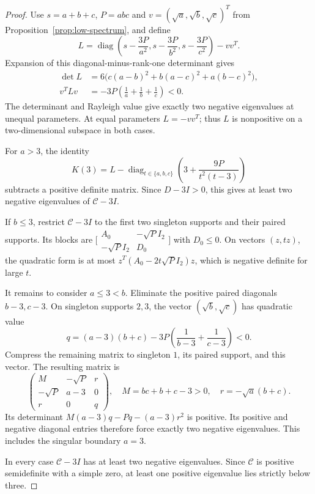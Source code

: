 \begin{proof}
Use $s=a+b+c$, $P=abc$ and $v=(\sqrt a,\sqrt b,\sqrt c)^T$ from
Proposition~\ref{prop:low-spectrum}, and define
\[
L=\operatorname{diag}\left(s-\frac{3P}{a^2},
s-\frac{3P}{b^2},s-\frac{3P}{c^2}\right)-vv^T.
\]
Expansion of this diagonal-minus-rank-one determinant gives
\begin{align*}
\det L&=6\bigl(c(a-b)^2+b(a-c)^2+a(b-c)^2\bigr),\\
v^TLv&=-3P\left(\frac1a+\frac1b+\frac1c\right)<0.
\end{align*}
The determinant and Rayleigh value give exactly two negative eigenvalues
at unequal parameters. At equal parameters $L=-vv^T$; thus $L$ is
nonpositive on a two-dimensional subspace in both cases.

For $a>3$, the identity
\[
K(3)=L-\operatorname{diag}_{t\in\{a,b,c\}}
\left(3+\frac{9P}{t^2(t-3)}\right)
\]
subtracts a positive definite matrix. Since $D-3I>0$, this gives
at least two negative eigenvalues of $\mathcal C-3I$.

If $b\leq3$, restrict $\mathcal C-3I$ to the first two singleton
supports and their paired supports. Its blocks are
$\bigl[\begin{smallmatrix}A_0&-\sqrt P I_2\\-\sqrt P I_2&D_0\end{smallmatrix}\bigr]$
with $D_0\leq0$. On vectors $(z,tz)$, the quadratic form is at most
$z^T(A_0-2t\sqrt P I_2)z$, which is negative definite for large $t$.

It remains to consider $a\leq3<b$. Eliminate the positive paired
diagonals $b-3,c-3$. On singleton supports $2,3$, the vector
$(\sqrt b,\sqrt c)$ has quadratic value
\[
 q=(a-3)(b+c)-3P\left(\frac1{b-3}+\frac1{c-3}\right)<0.
\]
Compress the remaining matrix to singleton $1$, its paired support,
and this vector. The resulting matrix is
\[
 \begin{pmatrix}M&-\sqrt P&r\\-\sqrt P&a-3&0\\r&0&q\end{pmatrix},
 \quad M=bc+b+c-3>0,\quad r=-\sqrt a(b+c).
\]
Its determinant $M(a-3)q-Pq-(a-3)r^2$ is positive.
Its positive and negative diagonal entries therefore force exactly
two negative eigenvalues. This includes the singular boundary $a=3$.

In every case $\mathcal C-3I$ has at least two negative eigenvalues.
Since $\mathcal C$ is positive semidefinite with a simple zero,
at least one positive eigenvalue lies strictly below three.
\end{proof}

